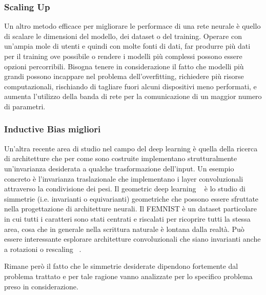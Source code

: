 \subsubsection{Scaling Up}
Un altro metodo efficace per migliorare le performace di una rete neurale 
è quello di scalare le dimensioni del modello, dei dataset o del training.
Operare con un'ampia mole di utenti e quindi con molte fonti di dati,
far produrre più dati per il training ove possibile o rendere i modelli 
più complessi possono essere opzioni percorribili. Bisogna tenere in 
considerazione il fatto che modelli più grandi possono incappare nel 
problema dell'overfitting, richiedere più risorse computazionali, 
rischiando di tagliare fuori alcuni dispositivi meno performati, e 
aumenta l'utilizzo della banda di rete per la comunicazione di un 
maggior numero di parametri.


\subsubsection{Inductive Bias migliori}
Un'altra recente area di studio nel campo del deep learning è quella 
della ricerca di architetture che per come sono costruite implementano
strutturalmente un'invarianza desiderata a qualche trasformazione 
dell'input. Un esempio concreto è l'invarianza traslazionale che 
implementano i layer convoluzionali attraverso la condivisione dei pesi.
Il geometric deep learning ~\cite{bronstein2021geometric} è lo studio di simmetrie 
(i.e. invarianti o equivarianti) geometriche che possono essere sfruttate nella 
progettazione di architetture neurali.
Il FEMNIST è un dataset particolare in cui tutti i caratteri sono stati
centrati e riscalati per ricoprire tutti la stessa area, cosa che in 
generale nella scrittura naturale è lontana dalla realtà. Può essere 
interessante esplorare architetture convoluzionali che siano invarianti 
anche a rotazioni o rescaling ~\cite{sosnovik2023symmetry, cohen2016group,
marcos2016rotation, cohen2016steer}.

Rimane però il fatto che le simmetrie desiderate dipendono fortemente 
dal problema trattato e per tale ragione vanno analizzate per lo 
specifico problema preso in considerazione.
